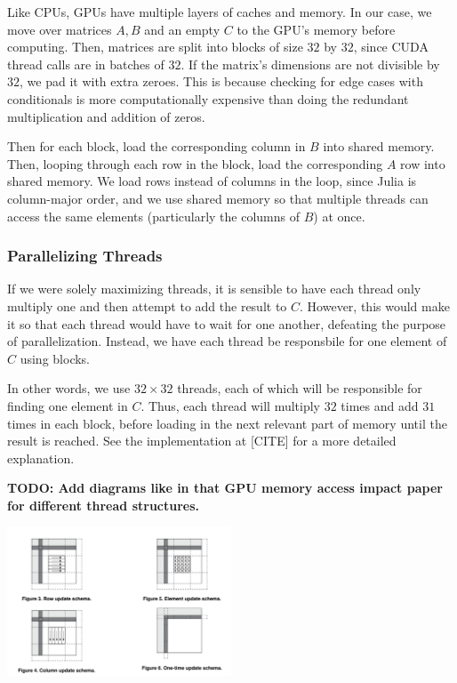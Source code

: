 Like CPUs, GPUs have multiple layers of caches and memory. In our case, we move over matrices $A, B$ and an empty $C$ to the GPU's memory before computing. Then, matrices are split into blocks of size $32$ by $32$, since CUDA thread calls are in batches of $32$. If the matrix's dimensions are not divisible by $32$, we pad it with extra zeroes. This is because checking for edge cases with conditionals is more computationally expensive than doing the redundant multiplication and addition of zeros.

Then for each block, load the corresponding column in $B$ into shared memory. Then, looping through each row in the block, load the corresponding $A$ row into shared memory. We load rows instead of columns in the loop, since Julia is column-major order, and we use shared memory so that multiple threads can access the same elements (particularly the columns of $B$) at once.

\subsubsection{Parallelizing Threads}

If we were solely maximizing threads, it is sensible to have each thread only multiply one and then attempt to add the result to $C$. However, this would make it so that each thread would have to wait for one another, defeating the purpose of parallelization. Instead, we have each thread be responsbile for one element of $C$ using blocks. 

In other words, we use $32 \times 32$ threads, each of which will be responsible for finding one element in $C$. Thus, each thread will multiply $32$ times and add $31$ times in each block, before loading in the next relevant part of memory until the result is reached. See the implementation at [CITE] for a more detailed explanation.

\textbf{TODO: Add diagrams like in that GPU memory access impact paper for different thread structures.}

\begin{center}
\includegraphics*[width=0.5\textwidth]{MatMulThreads.png}
\end{center}

